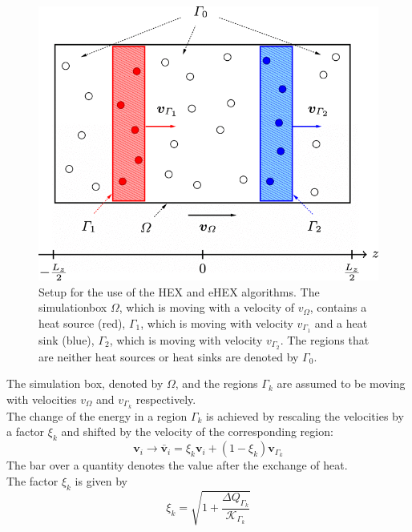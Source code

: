 \documentclass[12pt]{article}
\begin{document}
\begin{figure}
    \begin{center}
        \includegraphics[scale=0.3]{images/ehex_system.png}
        \caption{Setup for the use of the HEX and eHEX algorithms. The simulationbox $\Omega$, which is moving with a velocity of $v_\Omega$,
        contains a heat source (red), $\Gamma_1$, which is moving with velocity $v_{\Gamma_1}$ and a heat sink (blue), $\Gamma_2$, which is moving 
        with velocity $v_{\Gamma_2}$. The regions that are neither heat sources or heat sinks are denoted by $\Gamma_0$.}
        \label{fig:ehex} 
    \end{center}
\end{figure}
The simulation box, denoted by $\Omega$, and the regions $\Gamma_k$ are assumed to be moving with velocities $v_\Omega$ and $v_{\Gamma_k}$
respectively.\\
The change of the energy in a region $\Gamma_k$ is achieved by rescaling the velocities by a factor $\xi_k$ and shifted by the velocity of the
corresponding region:
\begin{equation}
    \mathbf{v}_i \rightarrow \mathbf{\bar{v}}_i = \xi_k \mathbf{v}_i + (1-\xi_k)\mathbf{v}_{\Gamma_k}
\end{equation}
The bar over a quantity denotes the value after the exchange of heat.\\
The factor $\xi_k$ is given by
\begin{equation}
    \xi_k = \sqrt{1+\frac{\Delta Q_{\Gamma_k}}{\mathcal{K}_{\Gamma_k}}}
\end{equation}
\end{document}
